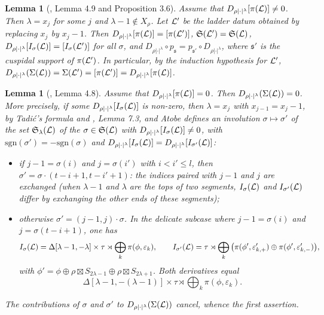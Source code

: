 \documentclass[a4paper,12pt,leqno]{amsart}
\theoremstyle{plain}
\newtheorem{lemma}[thm]{Lemma}
\theoremstyle{definition}
\providecommand{\frS}{\mathfrak{S}}\providecommand{\frs}{\mathfrak{s}}
\begin{document}
\begin{lemma}[\cite{Ato24}, Lemma 4.9 and Proposition 3.6]\label{lem:ato49} Assume that
$D_{\rho|\cdot|^\lambda}[\pi(\mathcal{L})]\neq0$. Then $\lambda=x_j$ for some $j$ and $\lambda-1\notin X_\rho$.
Let $\mathcal{L}'$ be the ladder datum obtained by replacing $x_j$ by $x_j-1$. Then
$D_{\rho|\cdot|^\lambda}[\pi(\mathcal{L})]=[\pi(\mathcal{L}')]$, $\frS(\caL')=\frS(\caL)$,
$D_{\rho|\cdot|^\lambda}[I_\sigma(\mathcal{L})]=[I_\sigma(\mathcal{L}')]$ for all $\sigma$, and
$D_{\rho|\cdot|^\lambda}\circ p_\frs=p_{\frs'}\circ D_{\rho|\cdot|^\lambda}$, where $\frs'$ is the cuspidal
support of $\pi(\mathcal{L}')$. In particular, by the induction hypothesis for $\mathcal{L}'$,
$D_{\rho|\cdot|^\lambda}(\Sigma(\mathcal{L}))=\Sigma(\mathcal{L}')=[\pi(\mathcal{L}')]=D_{\rho|\cdot|^\lambda}[\pi(\mathcal{L})]$.
\end{lemma}

\begin{lemma}[\cite{Ato24}, Lemma 4.8]\label{lem:ato48} Assume that
$D_{\rho|\cdot|^\lambda}[\pi(\mathcal{L})]=0$. Then $D_{\rho|\cdot|^\lambda}(\Sigma(\mathcal{L}))=0$. More precisely,
if some $D_{\rho|\cdot|^\lambda}[I_\sigma(\mathcal{L})]$ is non-zero, then $\lambda=x_j$ with $x_{j-1}=x_j-1$, by
Tadi\'c's formula and \cite{Xu17}, Lemma 7.3, and Atobe defines an involution
$\sigma\mapsto\sigma'$ of the set $\frS_\lambda(\caL)$ of the $\sigma\in\frS(\caL)$ with $D_{\rho|\cdot|^\lambda}[I_\sigma(\mathcal{L})]\neq0$,
with $\mathrm{sgn}(\sigma')=-\mathrm{sgn}(\sigma)$ and
$D_{\rho|\cdot|^\lambda}[I_\sigma(\mathcal{L})]=D_{\rho|\cdot|^\lambda}[I_{\sigma'}(\mathcal{L})]$:
\begin{itemize}
\item[(1)] if $j-1=\sigma(i)$ and $j=\sigma(i')$ with $i<i'\leq l$, then
$\sigma'=\sigma\cdot(t-i+1,t-i'+1)$: the indices paired with $j-1$ and $j$ are exchanged (when
$\lambda-1$ and $\lambda$ are the tops of two segments, $I_\sigma(\mathcal{L})$ and $I_{\sigma'}(\mathcal{L})$ differ by
exchanging the other ends of these segments);
\item[(2)] otherwise $\sigma'=(j-1,j)\cdot\sigma$. In the delicate subcase where
$j-1=\sigma(i)$ and $j=\sigma(t-i+1)$, one has
\[I_\sigma(\mathcal{L})=\Delta[\lambda-1,-\lambda]\times\tau\rtimes\bigoplus_k\pi(\phi,\varepsilon_k),\qquad
I_{\sigma'}(\mathcal{L})=\tau\rtimes\bigoplus_k\big(\pi(\phi',\varepsilon'_{k,+})\oplus\pi(\phi',\varepsilon'_{k,-})\big),\]
with $\phi'=\phi\oplus\rho\boxtimes S_{2\lambda-1}\oplus\rho\boxtimes S_{2\lambda+1}$. Both
derivatives equal
\[\Delta[\lambda-1,-(\lambda-1)]\times\tau\rtimes\bigoplus_k\pi(\phi,\varepsilon_k).\]
\end{itemize}
The contributions of $\sigma$ and $\sigma'$ to $D_{\rho|\cdot|^\lambda}(\Sigma(\mathcal{L}))$ cancel, whence the
first assertion.
\end{lemma}
\end{document}
